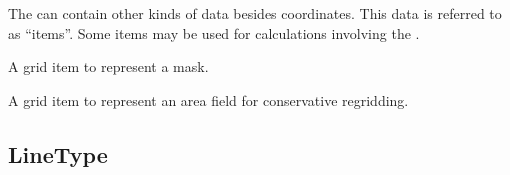 \documentclass[letterpaper,10pt,english]{sphinxmanual}
\begin{document}
\begin{fulllineitems}
\label{\detokenize{GridItem:ESMF.api.constants.GridItem}}
The {\hyperref[\detokenize{grid:ESMF.api.grid.Grid}]{}} can contain other kinds of data besides coordinates. This
data is referred to as {\hyperref[\detokenize{grid:ESMF.api.grid.Grid}]{}} “items”. Some items may be used
for calculations involving the {\hyperref[\detokenize{grid:ESMF.api.grid.Grid}]{}}.

\begin{fulllineitems}
\label{\detokenize{GridItem:ESMF.api.constants.GridItem.MASK}}
A grid item to represent a mask.

\end{fulllineitems}


\begin{fulllineitems}
\label{\detokenize{GridItem:ESMF.api.constants.GridItem.AREA}}
A grid item to represent an area field for conservative regridding.

\end{fulllineitems}


\end{fulllineitems}



\subsection{LineType}
\label{\detokenize{LineType:linetype}}\label{\detokenize{LineType::doc}}
\end{document}
